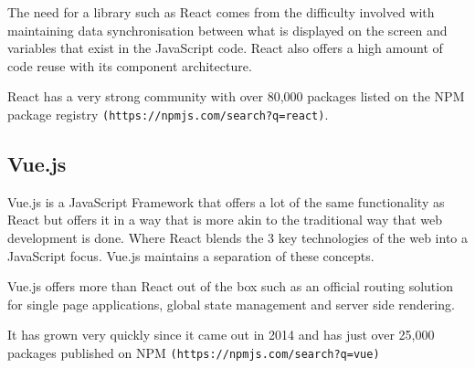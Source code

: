 The need for a library such as React comes from the difficulty involved with maintaining data synchronisation between what is displayed on the screen and variables that exist in the JavaScript code. React also offers a high amount of code reuse with its component architecture. 

React has a very strong community with over 80,000 packages listed on the NPM package registry \texttt{(https://npmjs.com/search?q=react)}.

\subsection{Vue.js}

Vue.js is a JavaScript Framework that offers a lot of the same functionality as React but offers it in a way that is more akin to the traditional way that web development is done. Where React blends the 3 key technologies of the web into a JavaScript focus. Vue.js maintains a separation of these concepts.

Vue.js offers more than React out of the box such as an official routing solution for single page applications, global state management and server side rendering.

It has grown very quickly since it came out in 2014 and has just over 25,000 packages published on NPM \texttt{(https://npmjs.com/search?q=vue)}

\pagebreak
